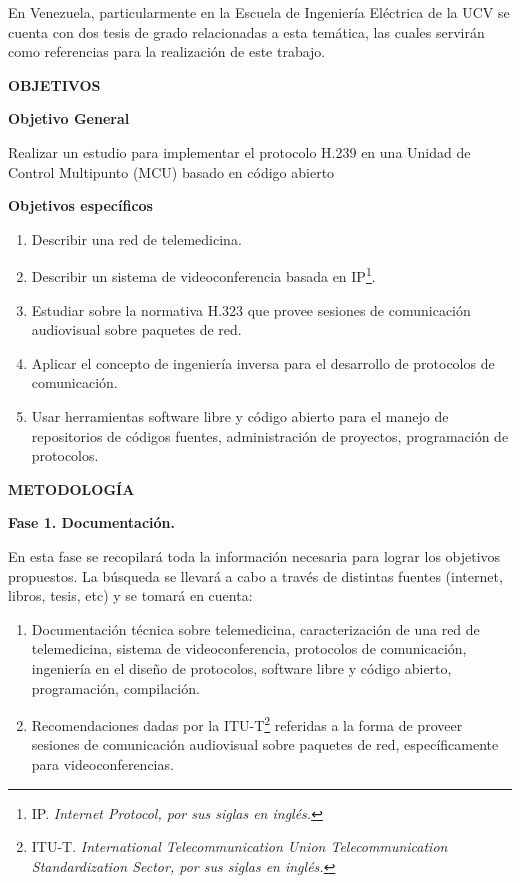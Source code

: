 \documentclass[12pt,letterpaper]{article}
\begin{document}
En Venezuela, particularmente en la Escuela de Ingeniería Eléctrica de la UCV se cuenta con dos tesis de grado relacionadas a esta temática\cite{Max}\cite{Sarif}, las cuales servirán como referencias  para la realización de este trabajo.

\centerline{\textbf{OBJETIVOS}}

\textbf{Objetivo General}

Realizar un estudio para implementar el protocolo H.239 en una Unidad de Control Multipunto (MCU) basado en código abierto 

\textbf{Objetivos específicos}	
	\begin{enumerate}
	\item Describir una red de telemedicina.
	\item Describir un sistema de videoconferencia basada en IP\footnote{IP. \emph{Internet Protocol, por sus siglas en inglés.}}.
	\item Estudiar sobre la normativa H.323 que provee sesiones de comunicación audiovisual sobre paquetes de red.
	\item Aplicar el concepto de ingeniería inversa para el desarrollo de protocolos de comunicación.
	\item Usar herramientas software libre y código abierto para el manejo de repositorios de códigos fuentes, administración de proyectos, programación de protocolos.
	\end{enumerate}

\centerline{\textbf{METODOLOGÍA}}

\textbf{Fase 1. Documentación.}

En esta fase se recopilará toda la información necesaria para lograr los objetivos propuestos. La búsqueda se llevará a cabo a través de distintas fuentes (internet, libros, tesis, etc) y se tomará en cuenta:
\begin{enumerate}
\item Documentación técnica sobre telemedicina, caracterización de una red de telemedicina, sistema de videoconferencia, protocolos de comunicación, ingeniería en el diseño de protocolos, software libre y código abierto, programación, compilación.  
\item Recomendaciones  dadas por la ITU-T\footnote{ITU-T. \emph{International Telecommunication Union Telecommunication Standardization Sector, por sus siglas en inglés.}} referidas a la forma de proveer sesiones de comunicación audiovisual sobre paquetes de red, específicamente para videoconferencias.
\end{enumerate}
\end{document}
